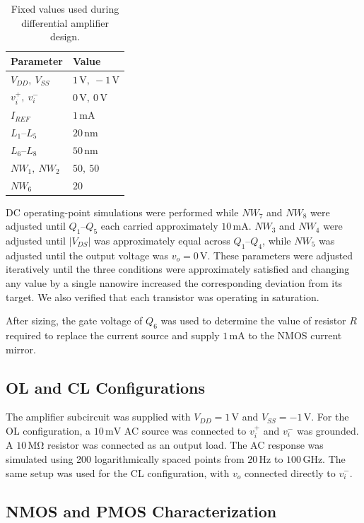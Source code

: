 \documentclass[11pt,a4paper]{article}
\begin{document}
\begin{table}[H]
\centering
\begin{tabular}{ll}
\toprule
Parameter & Value \\
\midrule
$V_{DD},\ V_{SS}$ & $1\,\mathrm{V},\ -1\,\mathrm{V}$ \\
$v_i^+,\ v_i^-$ & $0\,\mathrm{V},\ 0\,\mathrm{V}$ \\
$I_{REF}$ & $1\,\mathrm{mA}$ \\
$L_1$--$L_5$ & $20\,\mathrm{nm}$ \\
$L_6$--$L_8$ & $50\,\mathrm{nm}$ \\
$NW_1,\ NW_2$ & $50,\ 50$ \\
$NW_6$ & $20$ \\
\bottomrule
\end{tabular}
\caption{Fixed values used during differential amplifier design.}
\label{tab:fixed-design-values}
\end{table}

DC operating-point simulations were performed while $NW_7$ and $NW_8$ were adjusted until $Q_1$--$Q_5$ each carried approximately \(10\,\mathrm{mA}\). $NW_3$ and $NW_4$ were adjusted until $|V_{DS}|$ was approximately equal across $Q_1$--$Q_4$, while $NW_5$ was adjusted until the output voltage was $v_o=0\,\mathrm{V}$. 
These parameters were adjusted iteratively until the three conditions were approximately satisfied and changing any value by a single nanowire increased the corresponding deviation from its target. We also verified that each transistor was operating in saturation.

After sizing, the gate voltage of $Q_6$ was used to determine the value of resistor $R$ required to replace the current source and supply $1\,\mathrm{mA}$ to the NMOS current mirror.
\subsection{OL and CL Configurations}

The amplifier subcircuit was supplied with $V_{DD}=1\,\mathrm{V}$ and $V_{SS}=-1\,\mathrm{V}$. 
For the OL configuration, a \(10\,\mathrm{mV}\) AC source was connected to $v_i^+$ and $v_i^-$ was grounded. 
A \(10\,\mathrm{M\Omega}\) resistor was connected as an output load. 
The AC response was simulated using 200 logarithmically spaced points from \(20\,\mathrm{Hz}\) to \(100\,\mathrm{GHz}\). 
The same setup was used for the CL configuration, with $v_o$ connected directly to $v_i^-$.

\subsection{NMOS and PMOS Characterization}
\end{document}
